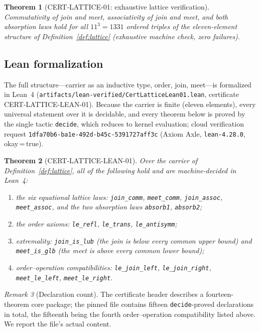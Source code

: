 \documentclass[11pt]{article}
\newtheorem{theorem}{Theorem}[section]
\theoremstyle{definition}
\theoremstyle{remark}
\newtheorem{remark}[theorem]{Remark}
\newcommand{\rid}[1]{\texttt{#1}}
\newcommand{\lean}[1]{\texttt{#1}}
\begin{document}
\begin{theorem}[CERT-LATTICE-01: exhaustive lattice verification]
\label{thm:lattice-enum}
Commutativity of join and meet, associativity of join and meet, and both
absorption laws hold for all $11^{3} = 1331$ ordered triples of the
eleven-element structure of Definition~\ref{def:lattice} (exhaustive machine
check, zero failures).
\end{theorem}

\subsection{Lean formalization}

The full structure---carrier as an inductive type, order, join, meet---is
formalized in Lean~4 (\lean{artifacts/lean-verified/CertLatticeLean01.lean},
certificate CERT-LATTICE-LEAN-01). Because the carrier is finite (eleven
elements), every universal statement over it is decidable, and every theorem
below is proved by the single tactic \texttt{decide}, which reduces to kernel
evaluation; cloud verification request
\rid{1dfa70b6-ba1e-492d-b45c-5391727aff3c} (Axiom Axle,
\texttt{lean-4.28.0}, okay\,=\,true).

\begin{theorem}[CERT-LATTICE-LEAN-01]\label{thm:lattice-lean}
Over the carrier of Definition~\ref{def:lattice}, all of the following hold
and are machine-decided in Lean~4:
\begin{enumerate}
\item the six equational lattice laws: \lean{join\_comm}, \lean{meet\_comm},
\lean{join\_assoc}, \lean{meet\_assoc}, and the two absorption laws
\lean{absorb1}, \lean{absorb2};
\item the order axioms: \lean{le\_refl}, \lean{le\_trans},
\lean{le\_antisymm};
\item extremality: \lean{join\_is\_lub} (the join is below every common upper
bound) and \lean{meet\_is\_glb} (the meet is above every common lower
bound);
\item order--operation compatibilities: \lean{le\_join\_left},
\lean{le\_join\_right}, \lean{meet\_le\_left}, \lean{meet\_le\_right}.
\end{enumerate}
\end{theorem}

\begin{remark}[Declaration count]
The certificate header describes a fourteen-theorem core package; the pinned
file contains fifteen \texttt{decide}-proved declarations in total, the
fifteenth being the fourth order--operation compatibility listed above. We
report the file's actual content.
\end{remark}
\end{document}
